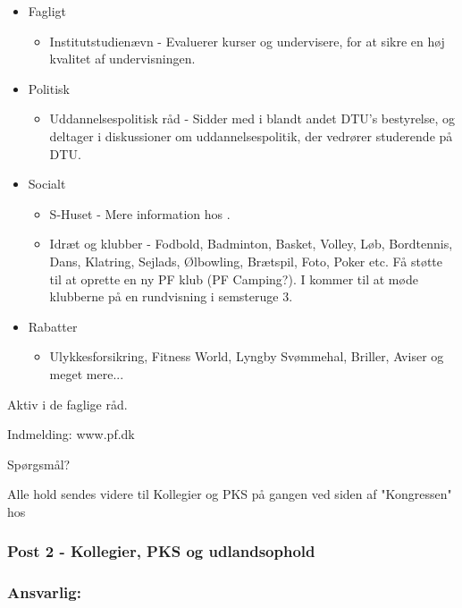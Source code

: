 \begin{itemize}
 \item Fagligt
 \begin{itemize}
  \item Institutstudienævn - Evaluerer kurser og undervisere, for at sikre en høj kvalitet af undervisningen.
 \end{itemize}
 \item Politisk
 \begin{itemize}
  \item Uddannelsespolitisk råd - Sidder med i blandt andet DTU's bestyrelse, og deltager i diskussioner om uddannelsespolitik, der vedrører studerende på DTU.
 \end{itemize}
 \item Socialt
 \begin{itemize}
  \item S-Huset - Mere information hos \hemorides.
  \item Idræt og klubber - Fodbold, Badminton, Basket, Volley, Løb, Bordtennis, Dans, Klatring, Sejlads, Ølbowling, Brætspil, Foto, Poker etc. Få støtte til at oprette en ny PF klub (PF Camping?). I kommer til at møde klubberne på en rundvisning i semsteruge 3.
 \end{itemize}
 \item Rabatter
 \begin{itemize}
  \item Ulykkesforsikring, Fitness World, Lyngby Svømmehal, Briller, Aviser og meget mere...
 \end{itemize}
\end{itemize}

Aktiv i de faglige råd.

Indmelding: www.pf.dk

Spørgsmål?

Alle hold sendes videre til Kollegier og PKS på gangen ved siden af "Kongressen" hos \Karla


\subsubsection*{\textbf{Post 2 - Kollegier, PKS og udlandsophold}}
\subsubsection*{\textbf{Ansvarlig:} \Karla}

